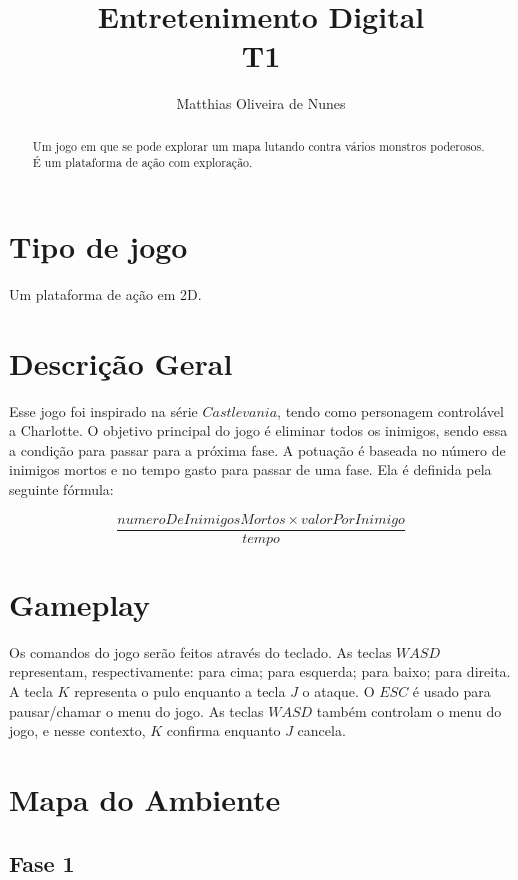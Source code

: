\documentclass[12pt]{article}
\title{Entretenimento Digital \\ T1}
\author{Matthias Oliveira de Nunes}
\begin{document}
\maketitle

\begin{abstract}

Um jogo em que se pode explorar um mapa lutando contra vários monstros
poderosos. É um plataforma de ação com exploração.

\end{abstract}

\section{Tipo de jogo}

Um plataforma de ação em 2D.

\section{Descrição Geral}

Esse jogo foi inspirado na série $Castlevania$, tendo como personagem
controlável a Charlotte. O objetivo principal do jogo é eliminar todos os
inimigos, sendo essa a condição para passar para a próxima fase. A potuação é
baseada no número de inimigos mortos e no tempo gasto para passar de uma fase.
Ela é definida pela seguinte fórmula:

\begin{equation}
        \frac{numeroDeInimigosMortos \times valorPorInimigo}{tempo}
\end{equation}

\section{Gameplay}

Os comandos do jogo serão feitos através do teclado. As teclas $WASD$
representam, respectivamente: para cima; para esquerda; para baixo; para
direita. A tecla $K$ representa o pulo enquanto a tecla $J$ o ataque. O $ESC$ é
usado para pausar/chamar o menu do jogo. As teclas $WASD$ também controlam o
menu do jogo, e nesse contexto, $K$ confirma enquanto $J$ cancela.

\section{Mapa do Ambiente}

\subsection{Fase 1}
\end{document}
